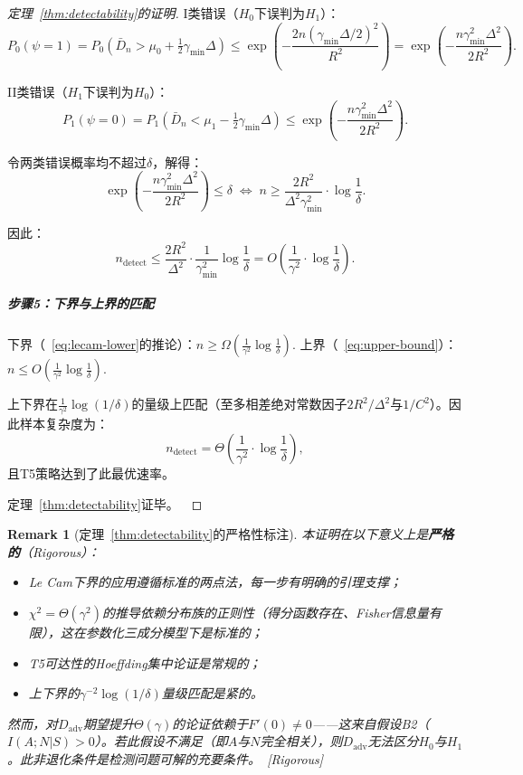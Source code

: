 \documentclass[12pt,a4paper]{article}
\newtheorem{remark}[theorem]{Remark}
\newcommand{\rigorous}{\textcolor{green!50!black}{\small\textsf{[Rigorous]}}}
\newcommand{\adv}{\mathrm{adv}}
\begin{document}
\begin{proof}[定理~\ref{thm:detectability}的证明]
I类错误（$H_0$下误判为$H_1$）：
\[
P_0(\psi=1) = P_0(\bar{D}_n > \mu_0 + \tfrac12 \gamma_{\min}\Delta)
           \leq \exp\!\left( -\frac{2n (\gamma_{\min}\Delta/2)^2}{R^2} \right)
           = \exp\!\left( -\frac{n \gamma_{\min}^2 \Delta^2}{2 R^2} \right).
\]

II类错误（$H_1$下误判为$H_0$）：
\[
P_1(\psi=0) = P_1(\bar{D}_n < \mu_1 - \tfrac12 \gamma_{\min}\Delta)
           \leq \exp\!\left( -\frac{n \gamma_{\min}^2 \Delta^2}{2 R^2} \right).
\]

令两类错误概率均不超过$\delta$，解得：
\[
\exp\!\left( -\frac{n \gamma_{\min}^2 \Delta^2}{2 R^2} \right) \leq \delta
\;\Longleftrightarrow\;
n \geq \frac{2 R^2}{\Delta^2 \gamma_{\min}^2} \cdot \log\frac{1}{\delta}.
\]

因此：
\begin{equation}\label{eq:upper-bound}
n_{\mathrm{detect}} \leq \frac{2 R^2}{\Delta^2} \cdot \frac{1}{\gamma_{\min}^2} \log\frac{1}{\delta}
= O\!\left( \frac{1}{\gamma^2} \cdot \log\frac{1}{\delta} \right).
\end{equation}

\subparagraph{步骤5：下界与上界的匹配}
下界（~\eqref{eq:lecam-lower}的推论）：$n \geq \Omega(\frac{1}{\gamma^2} \log\frac{1}{\delta})$.
上界（~\eqref{eq:upper-bound}）：$n \leq O(\frac{1}{\gamma^2} \log\frac{1}{\delta})$.

上下界在$\frac{1}{\gamma^2} \log(1/\delta)$的量级上匹配（至多相差绝对常数因子$2R^2/\Delta^2$与$1/C^2$）。因此样本复杂度为：
\[
n_{\mathrm{detect}} = \Theta\!\left( \frac{1}{\gamma^2} \cdot \log\frac{1}{\delta} \right),
\]
且T5策略达到了此最优速率。

定理~\ref{thm:detectability}证毕。~\blacksquare
\end{proof}

\begin{remark}[定理~\ref{thm:detectability}的严格性标注]
本证明在以下意义上是\textbf{严格的}（Rigorous）：
\begin{itemize}
  \item Le Cam下界的应用遵循标准的两点法，每一步有明确的引理支撑；
  \item $\chi^2 = \Theta(\gamma^2)$的推导依赖分布族的正则性（得分函数存在、Fisher信息量有限），这在参数化三成分模型下是标准的；
  \item T5可达性的Hoeffding集中论证是常规的；
  \item 上下界的$\gamma^{-2}\log(1/\delta)$量级匹配是紧的。
\end{itemize}
然而，对$D_{\adv}$期望提升$\Theta(\gamma)$的论证依赖于$F'(0) \neq 0$——这来自假设B2（$I(A;N|S)>0$）。若此假设不满足（即$A$与$N$完全相关），则$D_{\adv}$无法区分$H_0$与$H_1$。此非退化条件是检测问题可解的充要条件。~\rigorous
\end{remark}
\end{document}
